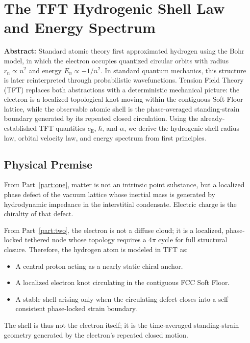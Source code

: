 \chapter{The TFT Hydrogenic Shell Law and Energy Spectrum}
\label{app:hydrogenic_shell}

\noindent\textbf{Abstract:} Standard atomic theory first approximated hydrogen using the Bohr model, in which the electron occupies quantized circular orbits with radius $r_n \propto n^2$ and energy $E_n \propto -1/n^2$. In standard quantum mechanics, this structure is later reinterpreted through probabilistic wavefunctions. Tension Field Theory (TFT) replaces both abstractions with a deterministic mechanical picture: the electron is a localized topological knot moving within the contiguous Soft Floor lattice, while the observable atomic shell is the phase-averaged standing-strain boundary generated by its repeated closed circulation. Using the already-established TFT quantities $c_{\mathrm{E}}$, $\hbar$, and $\alpha$, we derive the hydrogenic shell-radius law, orbital velocity law, and energy spectrum from first principles.

\section{Physical Premise}
From Part~\ref{part:one}, matter is not an intrinsic point substance, but a localized phase defect of the vacuum lattice whose inertial mass is generated by hydrodynamic impedance in the interstitial condensate. Electric charge is the chirality of that defect. 

From Part~\ref{part:two}, the electron is not a diffuse cloud; it is a localized, phase-locked tethered node whose topology requires a $4\pi$ cycle for full structural closure. Therefore, the hydrogen atom is modeled in TFT as:
\begin{itemize}
    \item A central proton acting as a nearly static chiral anchor.
    \item A localized electron knot circulating in the contiguous FCC Soft Floor.
    \item A stable shell arising only when the circulating defect closes into a self-consistent phase-locked strain boundary. 
\end{itemize}
The shell is thus not the electron itself; it is the time-averaged standing-strain geometry generated by the electron's repeated closed motion.

